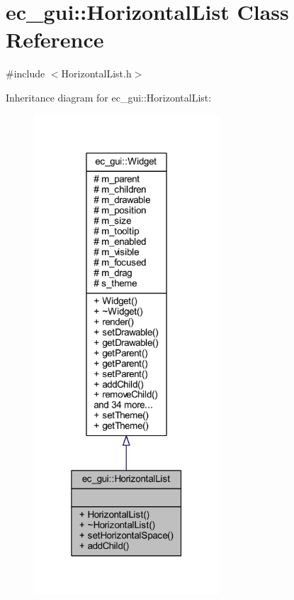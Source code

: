 \hypertarget{classec__gui_1_1_horizontal_list}{}\section{ec\+\_\+gui\+:\+:Horizontal\+List Class Reference}
\label{classec__gui_1_1_horizontal_list}


{\ttfamily \#include $<$Horizontal\+List.\+h$>$}



Inheritance diagram for ec\+\_\+gui\+:\+:Horizontal\+List\+:\nopagebreak
\begin{figure}[H]
\begin{center}
\leavevmode
\includegraphics[width=196pt]{classec__gui_1_1_horizontal_list__inherit__graph}
\end{center}
\end{figure}


